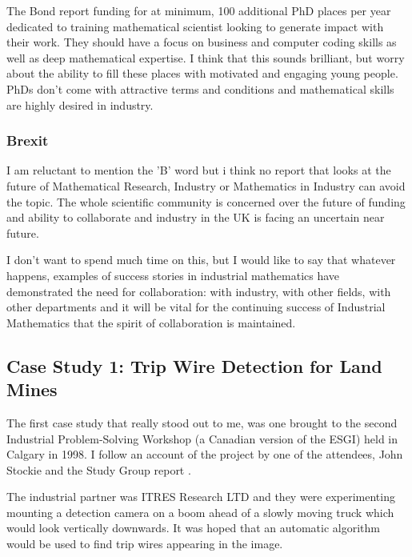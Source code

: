 \documentclass[11pt]{article} %
\begin{document}
The Bond report \cite{Bond} funding for at minimum, 100 additional PhD places per year dedicated to training mathematical scientist looking to generate impact with their work. They should have a focus on business and computer coding skills as well as deep mathematical expertise. I think that this sounds brilliant, but worry about the ability to fill these places with motivated and engaging young people. PhDs don't come with attractive terms and conditions and mathematical skills are highly desired in industry. 




	
	
	
	
	\subsubsection{Brexit}
	I am reluctant to mention the 'B' word but i think no report that looks at the future of Mathematical Research, Industry or Mathematics in Industry can avoid the topic. The whole scientific community is concerned over the future of funding and ability to collaborate \cite{Owens2018}  and industry in the UK is facing an uncertain near future.
	
	I don't want to spend much time on this, but I would like to say that whatever happens, examples of success stories in industrial mathematics have demonstrated the need for collaboration: with industry, with other fields, with other departments and it will be vital for the continuing success of Industrial Mathematics that the spirit of collaboration is maintained. 
	
	\subsection{Case Study 1: Trip Wire Detection for Land Mines \label{landmines}}
	
	The first case study that really stood out to me, was one brought to the second Industrial Problem-Solving Workshop (a Canadian version of the ESGI) held in Calgary in 1998. I follow an account of the project by one of the attendees, John Stockie \cite{Stockie2015} and the Study Group report \cite{Jessop}.
	
The industrial partner was ITRES Research LTD and they were experimenting mounting a detection camera on a boom ahead of a slowly moving truck which would look vertically downwards. It was hoped that an automatic algorithm would be used to find trip wires appearing in the image. 
	
\end{document}
